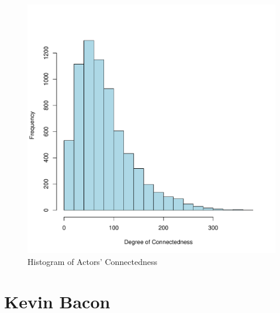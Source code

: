 \documentclass[11pt, fleqn]{article}\usepackage[]{graphicx}\usepackage[]{color}
\newenvironment{knitrout}{}{} %
\begin{document}
\begin{knitrout}
\color{fgcolor}\begin{figure}

{\centering \includegraphics[width=.49\linewidth]{figure/actor_hist-1} 

}

\caption[Histogram of Actors' Connectedness]{Histogram of Actors' Connectedness}\label{fig:actor_hist}
\end{figure}


\end{knitrout}

\section{Kevin Bacon}
\end{document}

